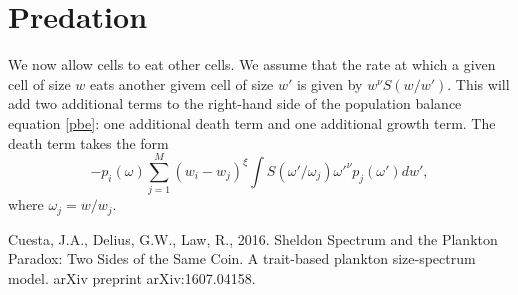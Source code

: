 \documentclass[a4paper,12pt]{article}
\newcommand{\w}{\omega}
\begin{document}
\section{Predation}
We now allow cells to eat other cells. We assume that the rate at which a given cell of size $w$
eats another givem cell of size $w'$ is given by $w^\nu S(w/w')$. 
This will add two additional terms to the right-hand side of the population
balance equation \eqref{pbe}: one additional death term and one additional growth term.
The death term takes the form
\[
-p_i(\w)\sum_{j=1}^M(w_i-w_j)^{\xi}\int S(\w'/\w_j)\w'^\nu p_j(\w')dw',
\]
where $\w_j=w/w_j$.


\begin{thebibliography}{9}

Cuesta, J.A., Delius, G.W., Law, R., 2016. Sheldon Spectrum and the Plankton Paradox: Two Sides of the Same Coin. A trait-based plankton size-spectrum model. arXiv preprint arXiv:1607.04158.

\end{thebibliography}
\end{document}
